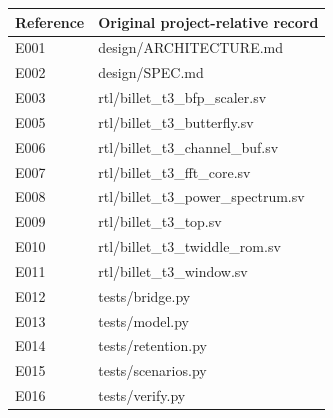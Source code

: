 \documentclass[11pt,a4paper]{article}
\begin{document}
{\small\renewcommand{\arraystretch}{1.18}\begin{longtable}{@{}L{0.12\textwidth}|L{0.82\textwidth}@{}}\toprule

\textbf{Reference} & \textbf{Original project-relative record}\\\midrule\endhead

E001 & design/\allowbreak{}ARCHITECTURE.md\\[2pt]\hline

E002 & design/\allowbreak{}SPEC.md\\[2pt]\hline

E003 & rtl/\allowbreak{}billet\_\allowbreak{}t3\_\allowbreak{}bfp\_\allowbreak{}scaler.sv\\[2pt]\hline

E005 & rtl/\allowbreak{}billet\_\allowbreak{}t3\_\allowbreak{}butterfly.sv\\[2pt]\hline

E006 & rtl/\allowbreak{}billet\_\allowbreak{}t3\_\allowbreak{}channel\_\allowbreak{}buf.sv\\[2pt]\hline

E007 & rtl/\allowbreak{}billet\_\allowbreak{}t3\_\allowbreak{}fft\_\allowbreak{}core.sv\\[2pt]\hline

E008 & rtl/\allowbreak{}billet\_\allowbreak{}t3\_\allowbreak{}power\_\allowbreak{}spectrum.sv\\[2pt]\hline

E009 & rtl/\allowbreak{}billet\_\allowbreak{}t3\_\allowbreak{}top.sv\\[2pt]\hline

E010 & rtl/\allowbreak{}billet\_\allowbreak{}t3\_\allowbreak{}twiddle\_\allowbreak{}rom.sv\\[2pt]\hline

E011 & rtl/\allowbreak{}billet\_\allowbreak{}t3\_\allowbreak{}window.sv\\[2pt]\hline

E012 & tests/\allowbreak{}bridge.py\\[2pt]\hline

E013 & tests/\allowbreak{}model.py\\[2pt]\hline

E014 & tests/\allowbreak{}retention.py\\[2pt]\hline

E015 & tests/\allowbreak{}scenarios.py\\[2pt]\hline

E016 & tests/\allowbreak{}verify.py\\[2pt]\hline


\end{longtable}}
\end{document}
